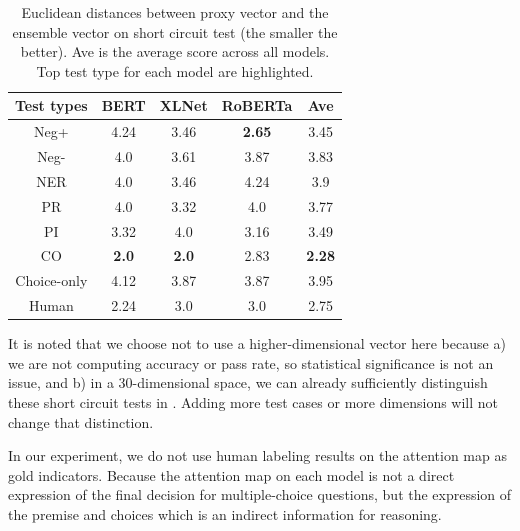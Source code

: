 \begin{table}[th]
    \scriptsize
    \centering
    \begin{tabular}{c|cccc}\hline
        \toprule  
        \textbf{Test types} &BERT  & XLNet & RoBERTa  &Ave\\ 
        \midrule
        {Neg+}      &  4.24     &   3.46  & \textbf{2.65}   &3.45\\
        \midrule
        {Neg-}&   4.0   &       3.61  & 3.87    &3.83\\
        \midrule
        {NER}    &   4.0    &  3.46      &  4.24    &3.9\\
        \midrule
        {PR}&    4.0    &    3.32   &   4.0 &3.77\\
        \midrule
        {PI}&   3.32    &    4.0    &   3.16    &3.49\\
        \midrule
        {CO}  &      \textbf{2.0}       &  \textbf{ 2.0} &  2.83    &\textbf{2.28}\\
        \midrule
        {Choice-only}   &  4.12     &3.87  &    3.87    &3.95\\
        \midrule
        {Human}   & 2.24    &   3.0&    3.0 &2.75\\
        \bottomrule
        \hline
    \end{tabular}
    \caption{\label{tab:agree} 
        Euclidean distances between proxy vector and 
        the ensemble vector on short circuit test (the smaller
        the better). 
        Ave is the average score across all models.
        Top test type for each model are highlighted.}
\end{table}

It is noted that we choose not to use a higher-dimensional vector
here because a) we are not computing accuracy or
pass rate, so statistical significance
is not an issue, and b) in a 30-dimensional space,
we can already sufficiently distinguish these short
circuit tests in . Adding more test cases
or more dimensions will not change that distinction.

In our experiment, we do not use human labeling results on the attention map 
as gold indicators.  Because the attention map on each model is not a direct 
expression of the final decision for multiple-choice questions, 
but the expression of the premise and choices which is an indirect information for reasoning.

\fi


